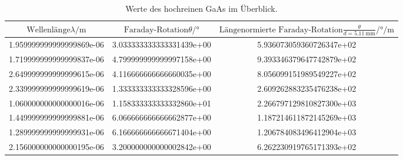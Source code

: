 \begin{table}
  \centering
  \begin{tabular}{S[scientific-notation=fixed, fixed-exponent =-6] S[scientific-notation=fixed, fixed-exponent = 0] S[scientific-notation=fixed, fixed-exponent = 0]}
    \toprule
    $\text{Wellenlänge} \lambda / \si{\meter}$ & $ \text{Faraday-Rotation} \theta / \si{\degree}$ &$ \text{Längenormierte Faraday-Rotation} \frac{\theta}{d=\SI{5.11}{\milli\meter}} / \si{\degree\per\meter}$ \\
    \midrule
    1.959999999999999869e-06&3.033333333333331439e+00&5.936073059360726347e+02\\
    1.719999999999999837e-06&4.799999999999997158e+00&9.393346379647742879e+02\\
    2.649999999999999615e-06&4.116666666666660035e+00&8.056099151989549227e+02\\
    2.339999999999999619e-06&1.333333333333328596e+00&2.609262883235476238e+02\\
    1.060000000000000016e-06&1.158333333333332860e+01&2.266797129810827300e+03\\
    1.449999999999999881e-06&6.066666666666662877e+00&1.187214611872145269e+03\\
    1.289999999999999931e-06&6.166666666666671404e+00&1.206784083496412904e+03\\
    2.156000000000000195e-06&3.200000000000002842e+00&6.262230919765171393e+02\\
    \bottomrule
  \end{tabular}
  \caption{Werte des hochreinen GaAs im Überblick.}
  \label{tab:HGaAstab}
\end{table}
